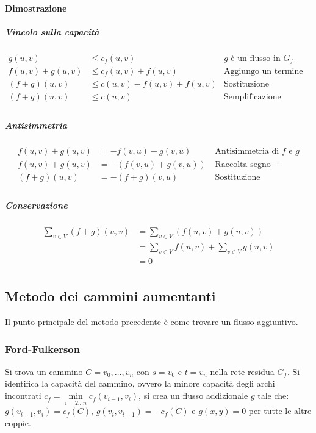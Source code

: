 \paragraph{Dimostrazione}
\subparagraph{Vincolo sulla capacit\`a}
\begin{align*}
	g(u, v) & \le c_f(u, v) \quad\quad & \text{$g$ \`e un flusso in $G_f$}\\
	f(u, v) + g(u, v) & \le c_f(u, v) + f(u, v) & \text{Aggiungo un termine uguale}\\
	(f+g)(u, v) & \le c(u, v) - f(u, v) + f(u, v) & \text{Sostituzione}\\
	(f+g)(u, v) & \le c(u, v) & \text{Semplificazione}\\
\end{align*}
\subparagraph{Antisimmetria}
\begin{align*}
	f(u, v) + g(u, v) & = -f(v, u) - g(v, u) \quad\quad & \text{Antisimmetria di $f$ e $g$}\\
	f(u, v) + g(u, v) & = -(f(v, u) + g(v, u)) & \text{Raccolta segno $-$}\\
	(f+g)(u, v) & = -(f+g)(v, u) & \text{Sostituzione}\\
\end{align*}
\subparagraph{Conservazione}
\begin{align*}
	\sum\limits_{v\in V} (f+g)(u, v) & = \sum\limits_{v\in V}(f(u, v) + g(u, v))\\
					 & = \sum\limits_{v\in V} f(u, v) + \sum\limits_{v\in V} g(u, v)\\
					 & = 0\\
\end{align*}
\subsection{Metodo dei cammini aumentanti}
Il punto principale del metodo precedente \`e come trovare un flusso aggiuntivo.
\subsubsection{Ford-Fulkerson}
Si trova un cammino $C=v_0, \dots, v_n$ con $s = v_0$ e $t= v_n$ nella rete residua $G_f$. Si identifica la capacit\`a del cammino, ovvero la minore capacit\`a degli archi incontrati
$c_f = \min\limits_{i = 2\dots n}c_f(v_{i-1}, v_i)$, si crea un flusso addizionale $g$ tale che: $g(v_{i-1}, v_i) = c_f(C)$, $g(v_i, v_{i-1}) = -c_f(C)$ e $g(x, y) = 0$ per tutte le 
altre coppie.\\ 

